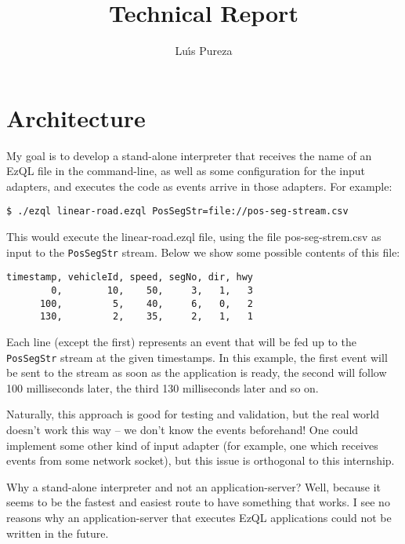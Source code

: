 \documentclass{report}
\begin{document}
\title{Technical Report}
\author{Lu\'{\i}s Pureza}

\maketitle

\tableofcontents

\addtolength{\parskip}{\baselineskip}

\chapter{Architecture}

My goal is to develop a stand-alone interpreter that receives the name
of an EzQL file in the command-line, as well as some configuration for
the input adapters, and executes the code as events arrive in those
adapters. For example:

\begin{verbatim}
$ ./ezql linear-road.ezql PosSegStr=file://pos-seg-stream.csv
\end{verbatim}

This would execute the linear-road.ezql file, using the file
pos-seg-strem.csv as input to the \verb=PosSegStr= stream. Below we
show some possible contents of this file:

\begin{verbatim}
timestamp, vehicleId, speed, segNo, dir, hwy
        0,        10,    50,     3,   1,   3
      100,         5,    40,     6,   0,   2
      130,         2,    35,     2,   1,   1
\end{verbatim}

Each line (except the first) represents an event that will be fed up
to the \verb=PosSegStr= stream at the given timestamps. In this
example, the first event will be sent to the stream as soon as the
application is ready, the second will follow 100 milliseconds later,
the third 130 milliseconds later and so on.

Naturally, this approach is good for testing and validation, but the
real world doesn't work this way -- we don't know the events
beforehand! One could implement some other kind of input adapter (for
example, one which receives events from some network socket), but this
issue is orthogonal to this internship.

Why a stand-alone interpreter and not an application-server? Well,
because it seems to be the fastest and easiest route to have something
that works. I see no reasons why an application-server that executes
EzQL applications could not be written in the future.
\end{document}
